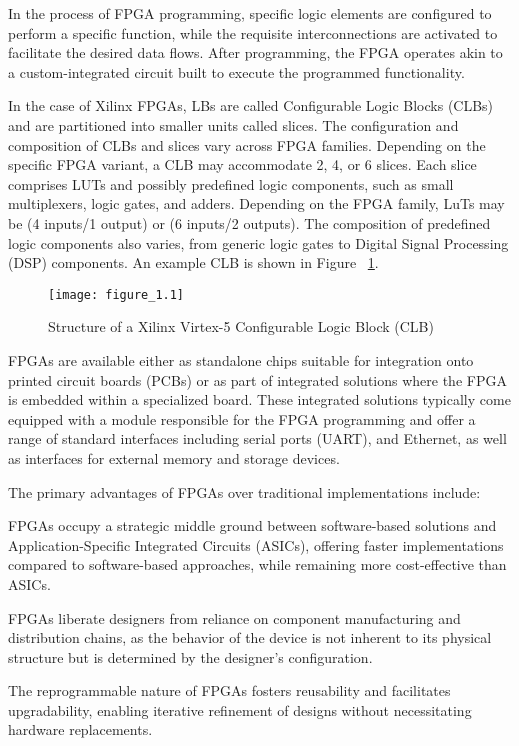 In the process of FPGA programming, specific logic elements are configured to perform a specific function,  while the requisite interconnections are activated to facilitate the desired data flows.  After programming, the FPGA operates akin to a custom-integrated circuit built to execute the programmed functionality.

In the case of Xilinx FPGAs, LBs are called Configurable Logic Blocks (CLBs) and are partitioned into smaller units called slices. The configuration and composition of CLBs and slices vary across FPGA families. Depending on the specific FPGA variant, a CLB may accommodate 2, 4, or 6 slices.
Each slice comprises LUTs and possibly predefined logic components, such as small multiplexers, logic gates, and adders. Depending on the FPGA family, LuTs may be (4 inputs/1 output) or (6 inputs/2 outputs). The composition of predefined logic components also varies, from generic logic gates to  Digital Signal Processing (DSP) components. An example CLB is shown in Figure ~\ref{fig:figure_1.1}.


\begin{figure}
\centering
\texttt{[image: figure\_1.1]}\\
\caption{Structure of a Xilinx Virtex-5 Configurable Logic Block (CLB)}
\label{fig:figure_1.1}
\end{figure}

FPGAs are available either as standalone chips suitable for integration onto printed circuit boards (PCBs) or as part of integrated solutions where the FPGA is embedded within a specialized board. These integrated solutions typically come equipped with a module responsible for the FPGA programming and offer a range of standard interfaces including serial ports (UART), and Ethernet, as well as interfaces for external memory and storage devices.

\pagebreak
The primary advantages of FPGAs over traditional implementations include:
\begin{outline}
\1 FPGAs occupy a strategic middle ground between software-based solutions and Application-Specific Integrated Circuits (ASICs), offering faster implementations compared to software-based approaches, while remaining more cost-effective than ASICs.

\1 FPGAs liberate designers from reliance on component manufacturing and distribution chains, as the behavior of the device is not inherent to its physical structure but is determined by the designer's configuration.

\1 The reprogrammable nature of FPGAs fosters reusability and facilitates upgradability, enabling iterative refinement of designs without necessitating hardware replacements.

\end{outline}

